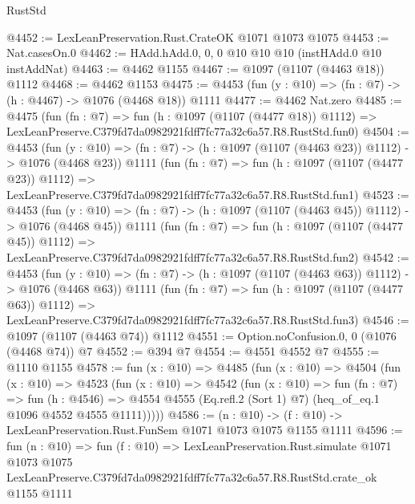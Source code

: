\begin{lexlean}{RustStd}
\begin{coremodule}
@4452 := LexLeanPreservation.Rust.CrateOK @1071 @1073 @1075
@4453 := Nat.casesOn.{0}
@4462 := HAdd.hAdd.{0, 0, 0} @10 @10 @10 (instHAdd.{0} @10 instAddNat)
@4463 := @4462 @1155
@4467 := @1097 (@1107 (@4463 @18)) @1112
@4468 := @4462 @1153
@4475 := @4453 (fun (y : @10) => (fn : @7) -> (h : @4467) -> @1076 (@4468 @18)) @1111
@4477 := @4462 Nat.zero
@4485 := @4475
    (fun (fn : @7) =>
    fun (h : @1097 (@1107 (@4477 @18)) @1112) =>
    LexLeanPreserve.C379fd7da0982921fdff7fc77a32c6a57.R8.RustStd.fun0)
@4504 := @4453
    (fun (y : @10) => (fn : @7) -> (h : @1097 (@1107 (@4463 @23)) @1112) -> @1076 (@4468 @23))
    @1111
    (fun (fn : @7) =>
    fun (h : @1097 (@1107 (@4477 @23)) @1112) =>
    LexLeanPreserve.C379fd7da0982921fdff7fc77a32c6a57.R8.RustStd.fun1)
@4523 := @4453
    (fun (y : @10) => (fn : @7) -> (h : @1097 (@1107 (@4463 @45)) @1112) -> @1076 (@4468 @45))
    @1111
    (fun (fn : @7) =>
    fun (h : @1097 (@1107 (@4477 @45)) @1112) =>
    LexLeanPreserve.C379fd7da0982921fdff7fc77a32c6a57.R8.RustStd.fun2)
@4542 := @4453
    (fun (y : @10) => (fn : @7) -> (h : @1097 (@1107 (@4463 @63)) @1112) -> @1076 (@4468 @63))
    @1111
    (fun (fn : @7) =>
    fun (h : @1097 (@1107 (@4477 @63)) @1112) =>
    LexLeanPreserve.C379fd7da0982921fdff7fc77a32c6a57.R8.RustStd.fun3)
@4546 := @1097 (@1107 (@4463 @74)) @1112
@4551 := Option.noConfusion.{0, 0} (@1076 (@4468 @74)) @7
@4552 := @394 @7
@4554 := @4551 @4552 @7
@4555 := @1110 @1155
@4578 := fun (x : @10) =>
  @4485
    (fun (x : @10) =>
    @4504
      (fun (x : @10) =>
      @4523
        (fun (x : @10) =>
        @4542
          (fun (x : @10) =>
          fun (fn : @7) =>
          fun (h : @4546) =>
          @4554 @4555 (Eq.refl.{2} (Sort 1) @7) (heq_of_eq.{1} @1096 @4552 @4555 @1111)))))
@4586 := (n : @10) -> (f : @10) -> LexLeanPreservation.Rust.FunSem @1071 @1073 @1075 @1155 @1111
@4596 := fun (n : @10) =>
  fun (f : @10) =>
  LexLeanPreservation.Rust.simulate
    @1071
    @1073
    @1075
    LexLeanPreserve.C379fd7da0982921fdff7fc77a32c6a57.R8.RustStd.crate_ok
    @1155
    @1111
\end{coremodule}
\end{lexlean}
